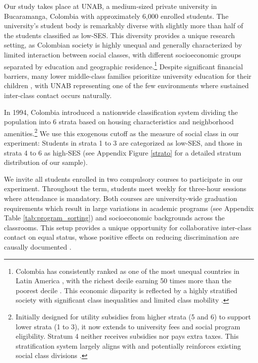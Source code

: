 \documentclass[11pt,a4paper,oneside]{article}
\begin{document}
Our study takes place at UNAB, a medium-sized private university in Bucaramanga, Colombia with approximately 6,000 enrolled students. The university's student body is remarkably diverse with slightly more than half of the students classified as low-SES. This diversity provides a unique research setting, as Colombian society is highly unequal and generally characterized by limited interaction between social classes, with different socioeconomic groups separated by education and geographic residence.\footnote{Colombia has consistently ranked as one of the most unequal countries in Latin America \citep{barretoherrera2024regional}, with the richest decile earning 50 times more than the poorest decile \citep{comisioneconomicaparaamericalatinayel2023}. This economic disparity is reflected by a highly stratified society with significant class inequalities and limited class mobility \citep{angulo2012movilidad,garcia2015loteria}.} Despite significant financial barriers, many lower middle-class families prioritize university education for their children \citep[p. 103]{hudson_colombia_2010}, with UNAB representing one of the few environments where sustained inter-class contact occurs naturally.

In 1994, Colombia introduced a nationwide classification system dividing the population into 6 strata based on housing characteristics and neighborhood amenities.\footnote{Initially designed for utility subsidies from higher strata (5 and 6) to support lower strata (1 to 3), it now extends to university fees and social program eligibility. Stratum 4 neither receives subsidies nor pays extra taxes. This stratification system largely aligns with and potentially reinforces existing social class divisions \citep{uribe2008estratificacion, guevara2019spatializing}.} We use this exogenous cutoff as the measure of social class in our experiment: Students in strata 1 to 3 are categorized as low-SES, and those in strata 4 to 6 as high-SES (see Appendix Figure \ref{strato} for a detailed stratum distribution of our sample).

We invite all students enrolled in two compulsory courses to participate in our experiment. Throughout the term, students meet weekly for three-hour sessions where attendance is mandatory. Both courses are university-wide graduation requirements which result in large variations in academic programs (see Appendix Table \ref{tab:program_sorting}) and socioeconomic backgrounds across the classrooms. This setup provides a unique opportunity for collaborative inter-class contact on equal status, whose positive effects on reducing discrimination are causally documented \citep{rao2019familiarity, mousa2020building,lowe2021types}.
\end{document}
